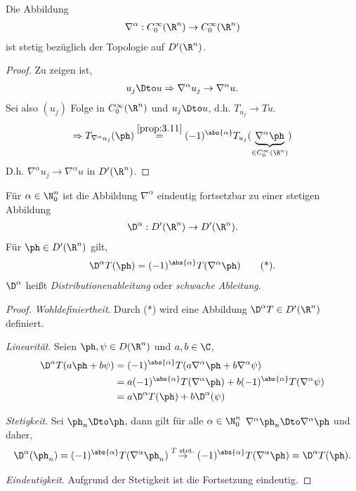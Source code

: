 \begin{prop}
\label{prop:3.12}
Die Abbildung
\begin{align*}
\nabla^\alpha : C_0^\infty(\R^n)\to C_0^\infty(\R^n)
\end{align*}
ist stetig bezüglich der Topologie auf $D'(\R^n)$.\fishhere
\end{prop}
\begin{proof}
Zu zeigen ist,
\begin{align*}
u_j\Dto u \Rightarrow \nabla^\alpha u_j \to \nabla^\alpha u.
\end{align*}
Sei also $(u_j)$ Folge in $C_0^\infty(\R^n)$ und $u_j\Dto u$, d.h.
$T_{u_j}\to Tu$.
\begin{align*}
\Rightarrow T_{\nabla^\alpha u_j}(\ph) \overset{\ref{prop:3.11}}{=}
(-1)^{\abs{\alpha}}
T_{u_j}(\underbrace{\nabla^\alpha \ph}_{\in C_0^\infty(\R^n)}) 
\end{align*}
D.h. $\nabla^\alpha u_j \to \nabla^\alpha u$ in $D'(\R^n)$.\qedhere
\end{proof}

\begin{prop}
\label{prop:3.13}
Für $\alpha\in\N_0^n$ ist die Abbildung $\nabla^\alpha$ eindeutig fortsetzbar
zu einer stetigen Abbildung
\begin{align*}
\D^\alpha : D'(\R^n)\to D'(\R^n).
\end{align*}
Für $\ph\in D'(\R^n)$ gilt,
\begin{align*}
\D^\alpha T(\ph) = (-1)^{\abs{\alpha}}T(\nabla^\alpha \ph)\tag{*}.
\end{align*}
$\D^\alpha$ heißt \emph{Distributionenableitung} oder \emph{schwache
Ableitung}.\fishhere
\end{prop}
\begin{proof}
\textit{Wohldefiniertheit}. Durch (*) wird eine Abbildung $\D^\alpha T\in
D'(\R^n)$ definiert.

\textit{Linearität}. Seien $\ph,\psi\in D(\R^n)$ und $a,b\in\C$,
\begin{align*}
\D^\alpha T(a\ph + b\psi) &= (-1)^{\abs{\alpha}} T(a\nabla^\alpha \ph +
b\nabla^\alpha \psi) \\ &= a (-1)^{\abs{\alpha}} T(\nabla^\alpha \ph) +
b(-1)^{\abs{\alpha}} T(\nabla^\alpha \psi) \\ &= a\D^\alpha T(\ph) +
b\D^\alpha(\psi)
\end{align*}

\textit{Stetigkeit}. Sei $\ph_n\Dto \ph$, dann gilt für alle $\alpha\in\N_0^n$
$\nabla^\alpha \ph_n \Dto \nabla^\alpha \ph$ und daher,
\begin{align*}
\D^\alpha(\ph_n) = (-1)^{\abs{\alpha}}
T(\nabla^\alpha \ph_n) \overset{T\text{
stet.}}{\to} (-1)^{\abs{\alpha}} T(\nabla^\alpha \ph) = \D^\alpha T(\ph).
\end{align*}

\textit{Eindeutigkeit}. Aufgrund der Stetigkeit ist die Fortsetzung
eindeutig.\qedhere
\end{proof}

